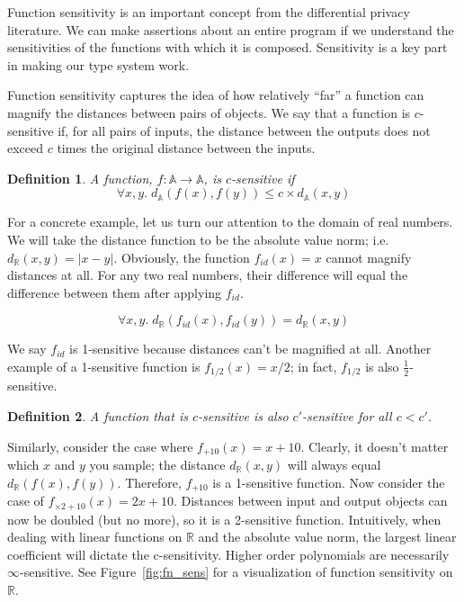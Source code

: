 \documentclass[12pt]{article}
\newtheorem{defn}{Definition}[section]
\begin{document}
Function sensitivity is an important concept from the differential privacy literature.
We can make assertions about an entire program if we understand the sensitivities of the functions with which it is composed.
Sensitivity is a key part in making our type system work.

Function sensitivity captures the idea of how relatively ``far'' a function can magnify the distances between pairs of objects.
We say that a function is $c$-sensitive if, for all pairs of inputs, the distance between the outputs does not exceed $c$ times the original distance between the inputs.

\begin{defn}\label{def:csens}
  A function, $f : \mathbb A \rightarrow \mathbb A$, is $c$-sensitive if
  $$\forall x,y.\; d_{\mathbb A}(f(x),f(y)) \le c \times d_{\mathbb A}(x,y)$$
\end{defn}

For a concrete example, let us turn our attention to the domain of real numbers.
We will take the distance function to be the absolute value norm; i.e. $d_\mathbb{R}(x,y) = |x - y|$.
Obviously, the function $f_{id}(x)=x$ cannot magnify distances at all.
For any two real numbers, their difference will equal the difference between them after applying $f_{id}$.

\[
  \forall x,y.\; d_\mathbb{R}(f_{id}(x),f_{id}(y)) = d_\mathbb{R}(x,y)
\]

We say $f_{id}$ is 1-sensitive because distances can't be magnified at all.
Another example of a 1-sensitive function is $f_{1/2}(x) = x/2$; in fact, $f_{1/2}$ is also $\frac{1}{2}$-sensitive.

\begin{defn}\label{def:clessthancprime}
  A function that is $c$-sensitive is also $c'$-sensitive for all $c < c'$.
\end{defn}

Similarly, consider the case where $f_{+10}(x) = x + 10$.
Clearly, it doesn't matter which $x$ and $y$ you sample; the distance $d_{\mathbb R}(x,y)$ will always equal $d_{\mathbb R}(f(x),f(y))$.
Therefore, $f_{+10}$ is a 1-sensitive function.
Now consider the case of $f_{\times 2+10}(x) = 2x + 10$.
Distances between input and output objects can now be doubled (but no more), so it is a 2-sensitive function.
Intuitively, when dealing with linear functions on $\mathbb R$ and the absolute value norm, the largest linear coefficient will dictate the c-sensitivity.
Higher order polynomials are necessarily $\infty$-sensitive.
See Figure~\ref{fig:fn_sens} for a visualization of function sensitivity on $\mathbb R$.
\end{document}
